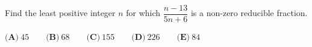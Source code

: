 Find the least positive integer $n$ for which $\dfrac{n-13}{5n+6}$ is a non-zero reducible fraction.

$\textbf{(A)}\ 45\qquad\textbf{(B)}\ 68\qquad\textbf{(C)}\ 155\qquad\textbf{(D)}\ 226\qquad\textbf{(E)}\ 84$
